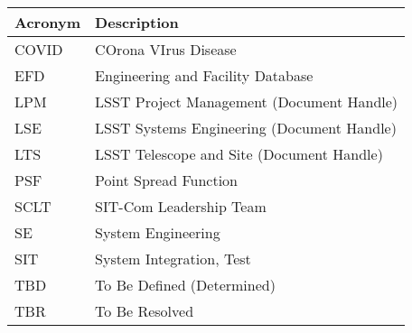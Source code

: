 \addtocounter{table}{-1}
\begin{longtable}{p{}p{}}\hline
\textbf{Acronym} & \textbf{Description}  \\\hline

COVID & COrona VIrus Disease \\\hline
EFD & Engineering and Facility Database \\\hline
LPM & LSST Project Management (Document Handle) \\\hline
LSE & LSST Systems Engineering (Document Handle) \\\hline
LTS & LSST Telescope and Site  (Document Handle) \\\hline
PSF & Point Spread Function \\\hline
SCLT & SIT-Com Leadership Team \\\hline
SE & System Engineering \\\hline
SIT & System Integration, Test \\\hline
TBD & To Be Defined (Determined) \\\hline
TBR & To Be Resolved \\\hline
\end{longtable}
